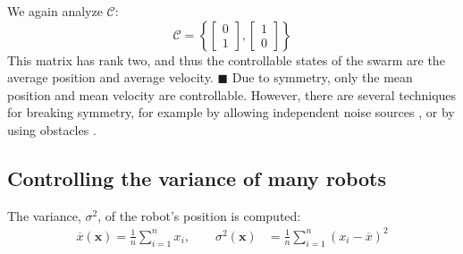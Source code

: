 We again analyze $\mathcal{C}$:
\begin{equation}
\mathcal{C}=\left\{ \begin{bmatrix} 
0\\
1
\end{bmatrix}
,
 \begin{bmatrix} 
1\\
0
\end{bmatrix}
 \right\}
\end{equation}
This matrix has rank two, and thus the controllable states of the swarm are the average position and average velocity.
$\blacksquare$ 
Due to symmetry, only the mean position and mean velocity are controllable. However, there are several techniques for breaking symmetry, for example by allowing independent noise sources \cite{beckerIJRR2014}, or by using obstacles \cite{Becker2013b}.

\subsection{Controlling the variance of many robots}\label{sec:VarianceControl}

The variance, $\sigma^2$, of the robot's position is computed:
\begin{align}
 \overline{x}(\mathbf{x}) = \frac{1}{n} \sum_{i=1}^n x_i, \qquad  %
\sigma^2(\mathbf{x}) &= \frac{1}{n} \sum_{i=1}^n (x_i - \overline{x})^2  %
\end{align}


